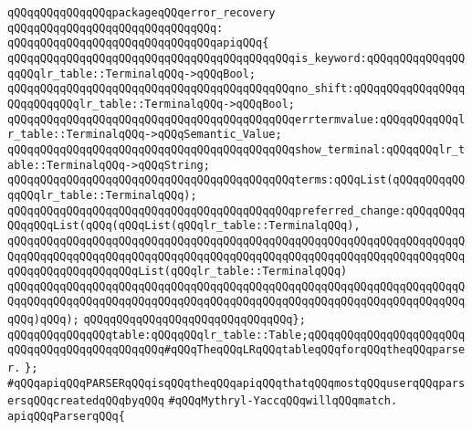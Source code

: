 \verb|qQQqqQQqqQQqqQQqpackageqQQqerror_recovery|\newline
\verb|qQQqqQQqqQQqqQQqqQQqqQQqqQQqqQQq:|\newline
\verb|qQQqqQQqqQQqqQQqqQQqqQQqqQQqqQQqapiqQQq{|\newline
\verb|qQQqqQQqqQQqqQQqqQQqqQQqqQQqqQQqqQQqqQQqqQQqis_keyword:qQQqqQQqqQQqqQQqqQQqlr_table::TerminalqQQq->qQQqBool;|\newline
\verb|qQQqqQQqqQQqqQQqqQQqqQQqqQQqqQQqqQQqqQQqqQQqno_shift:qQQqqQQqqQQqqQQqqQQqqQQqqQQqlr_table::TerminalqQQq->qQQqBool;|\newline
\verb|qQQqqQQqqQQqqQQqqQQqqQQqqQQqqQQqqQQqqQQqqQQqerrtermvalue:qQQqqQQqqQQqlr_table::TerminalqQQq->qQQqSemantic_Value;|\newline
\verb|qQQqqQQqqQQqqQQqqQQqqQQqqQQqqQQqqQQqqQQqqQQqshow_terminal:qQQqqQQqlr_table::TerminalqQQq->qQQqString;|\newline
\verb|qQQqqQQqqQQqqQQqqQQqqQQqqQQqqQQqqQQqqQQqqQQqterms:qQQqList(qQQqqQQqqQQqqQQqlr_table::TerminalqQQq);|\newline
\newline
\verb|qQQqqQQqqQQqqQQqqQQqqQQqqQQqqQQqqQQqqQQqqQQqpreferred_change:qQQqqQQqqQQqqQQqList(qQQq(qQQqList(qQQqlr_table::TerminalqQQq),|\newline
\verb|qQQqqQQqqQQqqQQqqQQqqQQqqQQqqQQqqQQqqQQqqQQqqQQqqQQqqQQqqQQqqQQqqQQqqQQqqQQqqQQqqQQqqQQqqQQqqQQqqQQqqQQqqQQqqQQqqQQqqQQqqQQqqQQqqQQqqQQqqQQqqQQqqQQqqQQqqQQqqQQqList(qQQqlr_table::TerminalqQQq)|\newline
\verb|qQQqqQQqqQQqqQQqqQQqqQQqqQQqqQQqqQQqqQQqqQQqqQQqqQQqqQQqqQQqqQQqqQQqqQQqqQQqqQQqqQQqqQQqqQQqqQQqqQQqqQQqqQQqqQQqqQQqqQQqqQQqqQQqqQQqqQQqqQQqqQQq)qQQq);|\newline
\verb|qQQqqQQqqQQqqQQqqQQqqQQqqQQqqQQq};|\newline
\newline
\verb|qQQqqQQqqQQqqQQqtable:qQQqqQQqlr_table::Table;qQQqqQQqqQQqqQQqqQQqqQQqqQQqqQQqqQQqqQQqqQQqqQQq#qQQqTheqQQqLRqQQqtableqQQqforqQQqtheqQQqparser.|\newline
\verb|};|\newline
\newline
\verb|#qQQqapiqQQqPARSERqQQqisqQQqtheqQQqapiqQQqthatqQQqmostqQQquserqQQqparsersqQQqcreatedqQQqbyqQQq|\newline
\verb|#qQQqMythryl-YaccqQQqwillqQQqmatch.|\newline
\newline
\newline
\verb|apiqQQqParserqQQq{|\newline
